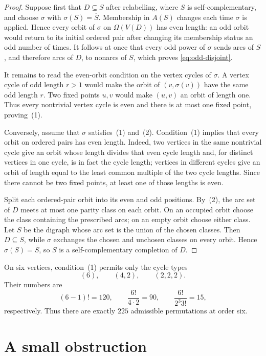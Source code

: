 \documentclass[11pt,reqno]{amsart}
\theoremstyle{definition}
\begin{document}
\begin{proof}
Suppose first that \(D\subseteq S\) after relabelling, where \(S\) is self-complementary, and choose \(\sigma\) with \(\sigma(S)=\overline S\). Membership in \(A(S)\) changes each time \(\sigma\) is applied. Hence every orbit of \(\sigma\) on \(\Omega(V(D))\) has even length: an odd orbit would return to its initial ordered pair after changing its membership status an odd number of times. It follows at once that every odd power of \(\sigma\) sends arcs of \(S\), and therefore arcs of \(D\), to nonarcs of \(S\), which proves \eqref{eq:odd-disjoint}.

It remains to read the even-orbit condition on the vertex cycles of \(\sigma\). A vertex cycle of odd length \(r>1\) would make the orbit of \((v,\sigma(v))\) have the same odd length \(r\). Two fixed points \(u,v\) would make \((u,v)\) an orbit of length one. Thus every nontrivial vertex cycle is even and there is at most one fixed point, proving~(1).

Conversely, assume that \(\sigma\) satisfies~(1) and~(2). Condition~(1) implies that every orbit on ordered pairs has even length. Indeed, two vertices in the same nontrivial cycle give an orbit whose length divides that even cycle length and, for distinct vertices in one cycle, is in fact the cycle length; vertices in different cycles give an orbit of length equal to the least common multiple of the two cycle lengths. Since there cannot be two fixed points, at least one of those lengths is even.

Split each ordered-pair orbit into its even and odd positions. By~(2), the arc set of \(D\) meets at most one parity class on each orbit. On an occupied orbit choose the class containing the prescribed arcs; on an empty orbit choose either class. Let \(S\) be the digraph whose arc set is the union of the chosen classes. Then \(D\subseteq S\), while \(\sigma\) exchanges the chosen and unchosen classes on every orbit. Hence \(\sigma(S)=\overline S\), so \(S\) is a self-complementary completion of \(D\).
\end{proof}

On six vertices, condition~(1) permits only the cycle types
\[
(6),\qquad (4,2),\qquad (2,2,2).
\]
Their numbers are
\[
(6-1)!=120,
\qquad
\frac{6!}{4\cdot2}=90,
\qquad
\frac{6!}{2^3 3!}=15,
\]
respectively. Thus there are exactly \(225\) admissible permutations at order six.

\section{A small obstruction}\label{sec:elementary}
\end{document}

